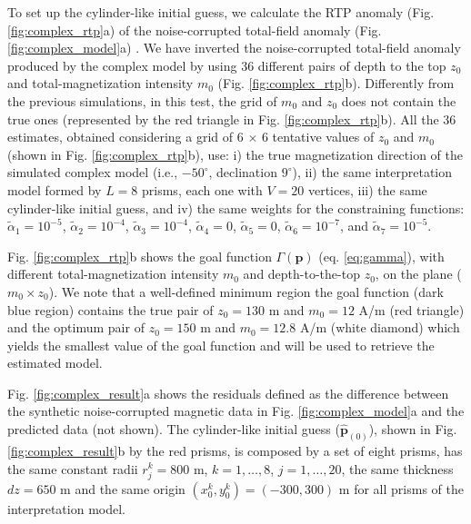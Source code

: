 To set up the cylinder-like initial guess, we calculate the RTP anomaly (Fig. \ref{fig:complex_rtp}a) of the noise-corrupted total-field anomaly 
(Fig. \ref{fig:complex_model}a) .
We have inverted the noise-corrupted total-field anomaly produced by the complex model by using 36 different pairs of depth to the top $ z_0 $ and total-magnetization intensity 
$ m_0 $ (Fig. \ref{fig:complex_rtp}b). 
Differently from the previous simulations, in this test, the grid of $ m_0 $ and $ z_0 $ 
does not contain the true ones (represented by the red triangle in Fig. \ref{fig:complex_rtp}b). 
All the 36 estimates, obtained considering a grid of 6 $\times$ 6 tentative values of  $z_0$ and $m_0$ (shown in  Fig. \ref{fig:complex_rtp}b), use: i) the true magnetization direction of the simulated complex model  (i.e.,  $ -50^\circ $, declination $ 9^\circ $), ii) the same interpretation model formed by $ L = 8 $ prisms, each one with $ V = 20 $ vertices, iii) the same cylinder-like initial guess, and iv) the same weights for the constraining functions: 
$\tilde{\alpha}_1 = 10^{-5}$, 
$\tilde{\alpha}_2 = 10^{-4}$, 
$\tilde{\alpha}_3 = 10^{-4}$, 
$\tilde{\alpha}_4 = 0$, 
$\tilde{\alpha}_5 = 0$, 
$\tilde{\alpha}_6 = 10^{-7}$, and 
$\tilde{\alpha}_7 = 10^{-5}$. 

Fig. \ref{fig:complex_rtp}b shows the goal function $ \Gamma(\mathbf{p}) $ (eq. \ref{eq:gamma}), with different total-magnetization intensity $ m_0 $ and depth-to-the-top $z_0$, on the plane ($ m_0 \times z_0 $). 
We note that a well-defined minimum region the goal function (dark blue region) contains the true pair of $z_0 = 130$ m and $m_0 = 12 $ A/m  (red triangle) and the optimum pair of 
$z_0 = 150$ m and $m_0 = 12.8 $ A/m (white diamond) which yields the smallest value of the goal function and will be used to retrieve the estimated model.


Fig. \ref{fig:complex_result}a shows the residuals defined as the difference
between the synthetic noise-corrupted magnetic data in Fig. \ref{fig:complex_model}a 
and the predicted data (not shown).
The cylinder-like initial guess ($ \hat{\mathbf{p}}_{(0)} $), shown 
in Fig. \ref{fig:complex_result}b by the red prisms, is composed by a set of eight prisms, has the same constant radii $ r^k_j = 800 $ m, $ k = 1, \dots, 8 $, $ j = 1, \dots, 20 $, 
the same thickness $ dz = 650 $ m and the same origin 
$ (x^k_0, y^k_0) = (-300, 300) $ m for all prisms of the interpretation model.

